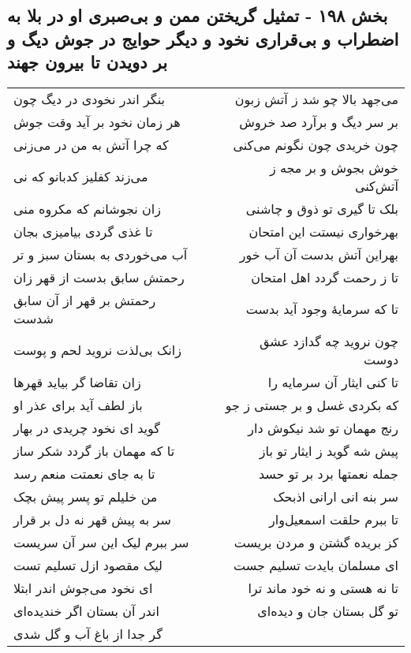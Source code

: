 \begin{center}
\section*{بخش ۱۹۸ - تمثیل گریختن ممن و بی‌صبری او در بلا به اضطراب و بی‌قراری نخود و دیگر حوایج در جوش دیگ و بر دویدن تا بیرون جهند}
\label{sec:sh198}
\begin{longtable}{l p{0.5cm} r}
بنگر اندر نخودی در دیگ چون
&&
می‌جهد بالا چو شد ز آتش زبون
\\
هر زمان نخود بر آید وقت جوش
&&
بر سر دیگ و برآرد صد خروش
\\
که چرا آتش به من در می‌زنی
&&
چون خریدی چون نگونم می‌کنی
\\
می‌زند کفلیز کدبانو که نی
&&
خوش بجوش و بر مجه ز آتش‌کنی
\\
زان نجوشانم که مکروه منی
&&
بلک تا گیری تو ذوق و چاشنی
\\
تا غذی گردی بیامیزی بجان
&&
بهرخواری نیستت این امتحان
\\
آب می‌خوردی به بستان سبز و تر
&&
بهراین آتش بدست آن آب خور
\\
رحمتش سابق بدست از قهر زان
&&
تا ز رحمت گردد اهل امتحان
\\
رحمتش بر قهر از آن سابق شدست
&&
تا که سرمایهٔ وجود آید بدست
\\
زانک بی‌لذت نروید لحم و پوست
&&
چون نروید چه گدازد عشق دوست
\\
زان تقاضا گر بیاید قهرها
&&
تا کنی ایثار آن سرمایه را
\\
باز لطف آید برای عذر او
&&
که بکردی غسل و بر جستی ز جو
\\
گوید ای نخود چریدی در بهار
&&
رنج مهمان تو شد نیکوش دار
\\
تا که مهمان باز گردد شکر ساز
&&
پیش شه گوید ز ایثار تو باز
\\
تا به جای نعمتت منعم رسد
&&
جمله نعمتها برد بر تو حسد
\\
من خلیلم تو پسر پیش بچک
&&
سر بنه انی ارانی اذبحک
\\
سر به پیش قهر نه دل بر قرار
&&
تا ببرم حلقت اسمعیل‌وار
\\
سر ببرم لیک این سر آن سریست
&&
کز بریده گشتن و مردن بریست
\\
لیک مقصود ازل تسلیم تست
&&
ای مسلمان بایدت تسلیم جست
\\
ای نخود می‌جوش اندر ابتلا
&&
تا نه هستی و نه خود ماند ترا
\\
اندر آن بستان اگر خندیده‌ای
&&
تو گل بستان جان و دیده‌ای
\\
گر جدا از باغ آب و گل شدی

\end{longtable}
\end{center}
